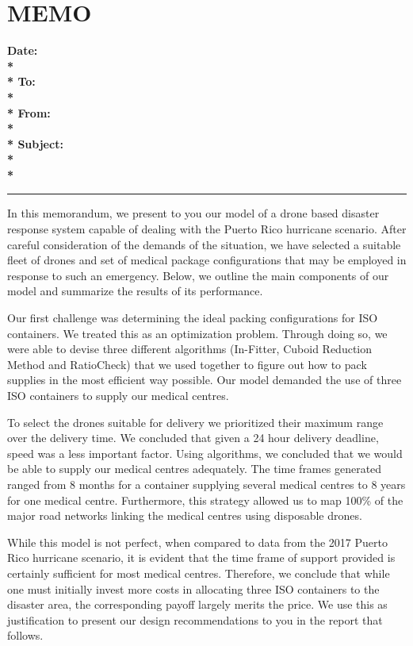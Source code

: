 \documentclass[a4paper,12pt]{article}
\begin{document}
\newpage

\section*{\hfil MEMO\hfil}
\hrulefill

\bf{Date:} \\*\\*
\bf{To:} \\*\\*
\bf{From:} \\*\\*
\bf{Subject:} \\*\\*
{\color{black}\hrule}
In this memorandum, we present to you our model of a drone based disaster response system capable of dealing with the Puerto Rico hurricane scenario. After careful consideration of the demands of the situation, we have selected a suitable fleet of drones and set of medical package configurations that may be employed in response to such an emergency. Below, we outline the main components of our model and summarize the results of its performance.

Our first challenge was determining the ideal packing configurations for ISO containers. We treated this as an optimization problem. Through doing so, we were able to devise three different algorithms (In-Fitter, Cuboid Reduction Method and RatioCheck) that we used together to figure out how to pack supplies in the most efficient way possible. Our model demanded the use of three ISO containers to supply our medical centres.

To select the drones suitable for delivery we prioritized their maximum range over the delivery time. We concluded that given a 24 hour delivery deadline, speed was a less important factor. Using algorithms, we concluded that we would be able to supply our medical centres adequately. The time frames generated ranged from 8 months for a container supplying several medical centres to 8 years for one medical centre. Furthermore, this strategy allowed us to map 100\% of the major road networks linking the medical centres using disposable drones.

While this model is not perfect, when compared to data from the 2017 Puerto Rico hurricane scenario, it is evident that the time frame of support provided is certainly sufficient for most medical centres. Therefore, we conclude that while one must initially invest more costs in allocating three ISO containers to the disaster area, the corresponding payoff largely merits the price. We use this as justification to present our design recommendations to you in the report that follows.
\end{document}
